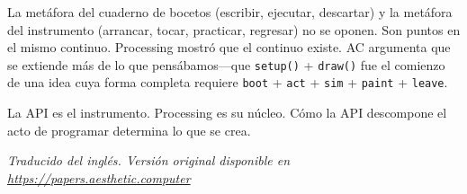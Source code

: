 \documentclass[10pt,letterpaper,twocolumn]{article}
\begin{document}
La metáfora del cuaderno de bocetos (escribir, ejecutar, descartar) y la metáfora del instrumento (arrancar, tocar, practicar, regresar) no se oponen. Son puntos en el mismo continuo. Processing mostró que el continuo existe. AC argumenta que se extiende más de lo que pensábamos---que \texttt{setup()} + \texttt{draw()} fue el comienzo de una idea cuya forma completa requiere \texttt{boot} + \texttt{act} + \texttt{sim} + \texttt{paint} + \texttt{leave}.

La API es el instrumento. Processing es su núcleo. Cómo la API descompone el acto de programar determina lo que se crea.

\vspace{0.5em}
\noindent\textit{Traducido del inglés. Versión original disponible en \url{https://papers.aesthetic.computer}}



\end{document}
